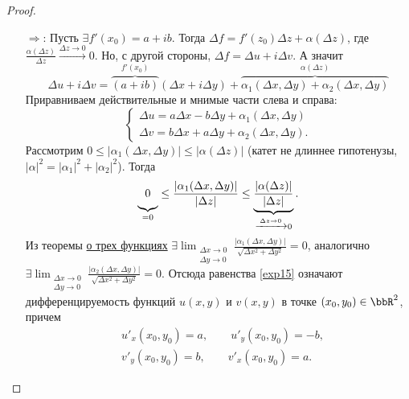 \begin{proof}
$ $\linebreak
\vspace*{-\baselineskip}
\begin{itemize}
\item[$\Longrightarrow$:]
Пусть $\exists f'(x_0) = a+ib $. Тогда $\Delta f = f'(z_0)\Delta z + \alpha(\Delta z)$, где $\frac{\alpha(\Delta z)}{\Delta z}\xrightarrow{\Delta z \to 0}0$. Но, с другой стороны, $\Delta f = \Delta u + i \Delta v$. А значит
\vspace*{-\baselineskip}
$$
\Delta u + i \Delta v = \overbrace{(a+ib)}^{f'(x_0)}(\Delta x + i \Delta y) + \overbrace{\alpha_1(\Delta x, \Delta y) + \alpha_2(\Delta x, \Delta y)}^{\alpha(\Delta z)}
$$
Приравниваем действительные и мнимые части слева и справа:
\begin{equation}
\label{exp15}
\begin{cases}
\Delta u = a\Delta x - b \Delta y + \alpha_1(\Delta x, \Delta y) \\
\Delta v = b\Delta x + a \Delta y + \alpha_2(\Delta x, \Delta y).
\end{cases}
\end{equation}
Рассмотрим $0 \le |\alpha_1(\Delta x, \Delta y)| \le |\alpha(\Delta z)|$ (катет не длиннее гипотенузы, $|\alpha|^2=|\alpha_1|^2 + |\alpha_2|^2 $). Тогда
$$
\underbrace{{{\vphantom{\frac{0}{0}}}}0}_{=0} \le \frac{|\alpha_1(\Delta x, \Delta y)|}{|\Delta z|} \le \underbrace{\frac{|\alpha(\Delta z)|}{|\Delta z|}}_{\xrightarrow{\Delta z \to 0} 0 }.
$$
Из теоремы \hyperref[exp14]{о трех функциях} $\exists \lim_{\substack{\Delta x \to 0\\ \Delta y \to 0}}\limits \frac{|\alpha_1(\Delta x,\Delta y)|}{\sqrt{\Delta x ^2 + \Delta y^2}} = 0$, аналогично $\exists \lim_{\substack{\Delta x \to 0\\ \Delta y \to 0}}\limits \frac{|\alpha_2(\Delta x,\Delta y)|}{\sqrt{\Delta x^2 + \Delta y^2}} = 0$. 
Отсюда равенства \eqref{exp15} означают дифференцируемость функций $u(x,y)$ и $v(x,y)$ в точке $(x_0,y_0) \in \bbR^2$, причем 
\begin{equation}
\label{exp16}
\begin{split}
&u'_x(x_0,y_0) = a, \qquad u'_y(x_0,y_0) = -b,\\
&v'_y(x_0,y_0) = b, \qquad v'_x(x_0,y_0) = a.
\end{split}
\end{equation}


\end{itemize}
\end{proof}
